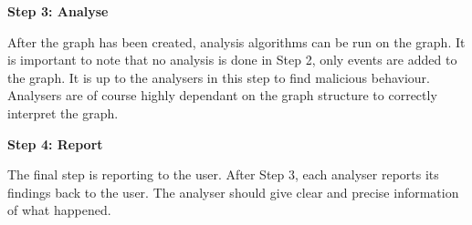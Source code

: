 \textbf{Step 3: Analyse}

After the graph has been created, analysis algorithms can be run on the graph. It is important to note that no analysis is done in Step 2, only events are added to the graph. It is up to the analysers in this step to find malicious behaviour. Analysers are of course highly dependant on the graph structure to correctly interpret the graph.

\textbf{Step 4: Report}

The final step is reporting to the user. After Step 3, each analyser reports its findings back to the user. The analyser should give clear and precise information of what happened.
